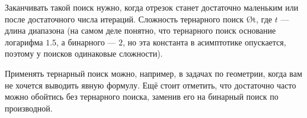 Заканчивать такой поиск нужно, когда отрезок станет достаточно маленьким или после достаточного числа итераций. Сложность тернарного поиск \O{\log t}, где $t$ — длина диапазона (на самом деле понятно, что тернарного поиск основание логарифма $1.5$, а бинарного — $2$, но эта константа в асимптотике опускается, поэтому у поисков одинаковые сложности).

Применять тернарный поиск можно, например, в задачах по геометрии, когда вам не хочется выводить явную формулу. Ещё стоит отметить, что достаточно часто можно обойтись без тернарного поиска, заменив его на бинарный поиск по производной.
